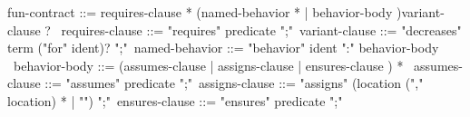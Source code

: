 \begin{syntax}
  fun-contract ::= requires-clause * (named-behavior * | behavior-body )variant-clause ? \
  requires-clause ::= "requires" predicate ";"\
  variant-clause ::= "decreases" term ("for" ident)? ";"\
  named-behavior ::= "behavior" ident ":" behavior-body \
  behavior-body ::= (assumes-clause | assigns-clause |
              ensures-clause ) * \
  assumes-clause ::= "assumes" predicate ";"\
  assigns-clause ::= "assigns" (location ("," location) * |
  "\nothing") ";"\
  ensures-clause ::= "ensures" predicate ";"
\end{syntax}
